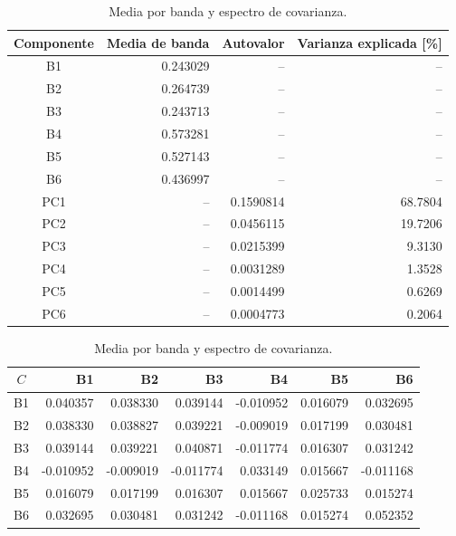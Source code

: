 \documentclass[11pt,a4paper]{article}
\begin{document}
\begin{table}[H]\centering\small
\caption{Media por banda y espectro de covarianza.}\label{tab:estadisticos}
\begin{tabular}{c r r r}\toprule
Componente & Media de banda & Autovalor & Varianza explicada [\%]\\\midrule
B1 & 0.243029 & -- & --\\
B2 & 0.264739 & -- & --\\
B3 & 0.243713 & -- & --\\
B4 & 0.573281 & -- & --\\
B5 & 0.527143 & -- & --\\
B6 & 0.436997 & -- & --\\\midrule
PC1 & -- & 0.1590814 & 68.7804\\
PC2 & -- & 0.0456115 & 19.7206\\
PC3 & -- & 0.0215399 & 9.3130\\
PC4 & -- & 0.0031289 & 1.3528\\
PC5 & -- & 0.0014499 & 0.6269\\
PC6 & -- & 0.0004773 & 0.2064\\\bottomrule
\end{tabular}

\vspace{0.5em}\small
\begin{tabular}{c|rrrrrr}\toprule
$C$ & B1 & B2 & B3 & B4 & B5 & B6\\\midrule
B1 & 0.040357 & 0.038330 & 0.039144 & -0.010952 & 0.016079 & 0.032695\\
B2 & 0.038330 & 0.038827 & 0.039221 & -0.009019 & 0.017199 & 0.030481\\
B3 & 0.039144 & 0.039221 & 0.040871 & -0.011774 & 0.016307 & 0.031242\\
B4 & -0.010952 & -0.009019 & -0.011774 & 0.033149 & 0.015667 & -0.011168\\
B5 & 0.016079 & 0.017199 & 0.016307 & 0.015667 & 0.025733 & 0.015274\\
B6 & 0.032695 & 0.030481 & 0.031242 & -0.011168 & 0.015274 & 0.052352\\\bottomrule
\end{tabular}
\end{table}
\end{document}
